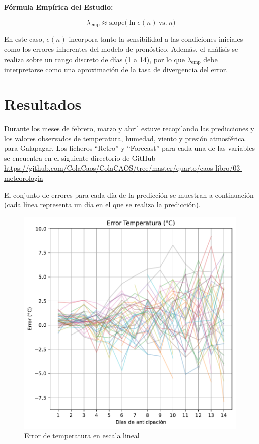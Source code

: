 \documentclass[
  10pt,
  a4paper,
  DIV=11,
  numbers=noendperiod,
  open=any]{scrreprt}
\numberwithin{equation}{chapter}
\numberwithin{equation}{section}
\renewcommand{\[}{\begin{equation}}
\renewcommand{\]}{\end{equation}}
\begin{document}
\textbf{Fórmula Empírica del Estudio:}

\begin{equation}
\lambda_{\text{emp}} \approx \text{slope}\bigl(\ln e(n)\ \text{vs.}\ n\bigr)
\end{equation}

En este caso, \(e(n)\) incorpora tanto la sensibilidad a las condiciones
iniciales como los errores inherentes del modelo de pronóstico. Además,
el análisis se realiza sobre un rango discreto de días (1 a 14), por lo
que \(\lambda_{\text{emp}}\) debe interpretarse como una aproximación de
la tasa de divergencia del error.

\section{Resultados}\label{resultados-2}

Durante los meses de febrero, marzo y abril estuve recopilando las
predicciones y los valores observados de temperatura, humedad, viento y
presión atmosférica para Galapagar. Los ficheros ``Retro'' y ``Forecast''  para cada una de las variables se encuentra en el siguiente directorio de GitHub \url{https://github.com/ColaCaos/ColaCAOS/tree/master/quarto/caos-libro/03-meteorologia}

El conjunto de errores para cada día de la predicción se muestran a
continuación (cada línea representa un día en el que se realiza la
predicción).

\begin{figure}[h]
  \centering
  \includegraphics[width=0.99\textwidth]{03-meteorologia/predicciones_files/figure-pdf/cell-2-output-1.pdf}
  \caption{Error de temperatura en escala lineal}
\end{figure}
\end{document}
